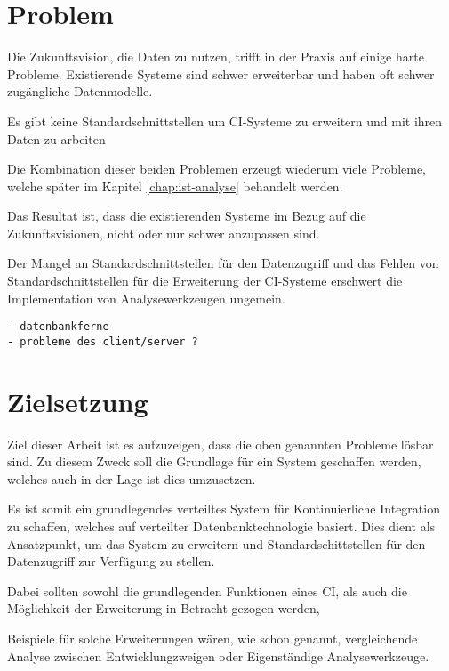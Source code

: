 

\section{Problem}

Die Zukunftsvision, die Daten zu nutzen,
trifft in der Praxis auf einige harte Probleme.
Existierende Systeme sind schwer erweiterbar und haben oft schwer zugängliche Datenmodelle.

Es gibt keine Standardschnittstellen um CI-Systeme zu erweitern und mit ihren Daten zu arbeiten

Die Kombination dieser beiden Problemen erzeugt wiederum viele Probleme,
welche später im Kapitel \ref{chap:ist-analyse} behandelt werden.

Das Resultat ist, dass die existierenden Systeme im Bezug auf die Zukunftsvisionen,
nicht oder nur schwer anzupassen sind.

Der Mangel an Standardschnittstellen für den Datenzugriff und
das Fehlen von Standardschnittstellen für die Erweiterung der CI-Systeme
erschwert die Implementation von Analysewerkzeugen ungemein.



\begin{verbatim}
- datenbankferne
- probleme des client/server ?
\end{verbatim}

\section{Zielsetzung}

Ziel dieser Arbeit ist es  aufzuzeigen, dass die oben genannten Probleme lösbar sind.
Zu diesem Zweck soll die Grundlage für ein System geschaffen werden,
welches auch in der Lage ist dies umzusetzen.

Es ist somit ein grundlegendes verteiltes System f\"ur Kontinuierliche Integration zu schaffen,
welches auf verteilter Datenbanktechnologie basiert.
Dies dient als Ansatzpunkt, um das System zu erweitern und
Standardschittstellen f\"ur den Datenzugriff zur Verf\"ugung zu stellen.

Dabei sollten sowohl die grundlegenden Funktionen eines CI,
als auch die M\"oglichkeit der Erweiterung in Betracht gezogen werden,

Beispiele f\"ur solche Erweiterungen wären,
wie schon genannt,
vergleichende Analyse zwischen Entwicklungzweigen oder Eigenständige Analysewerkzeuge.

